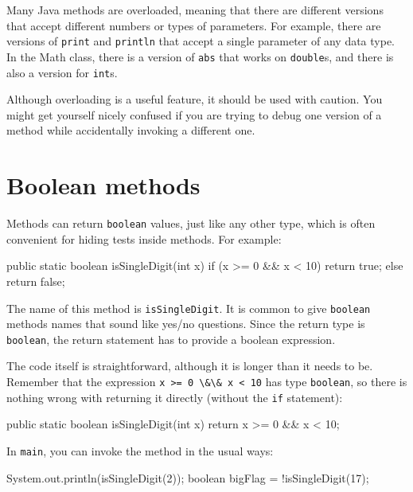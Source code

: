 \documentclass[12pt]{book}
\theoremstyle{exercise}
\newcommand{\java}[1]{\verb"#1"}
\begin{document}
Many Java methods are overloaded, meaning that there are different versions that accept different numbers or types of parameters.
For example, there are versions of \java{print} and \java{println} that accept a single parameter of any data type.
In the Math class, there is a version of \java{abs} that works on \java{double}s, and there is also a version for \java{int}s.

Although overloading is a useful feature, it should be used with caution.
You might get yourself nicely confused if you are trying to debug one version of a method while accidentally invoking a different one.


\section{Boolean methods}
\label{boolean}


Methods can return \java{boolean} values, just like any other type, which is often convenient for hiding tests inside methods.
For example:

\begin{code}
    public static boolean isSingleDigit(int x) {
        if (x >= 0 && x < 10) {
            return true;
        } else {
            return false;
        }
    }
\end{code}

The name of this method is \java{isSingleDigit}.
It is common to give \java{boolean} methods names that sound like yes/no questions.
Since the return type is \java{boolean}, the return statement has to provide a boolean expression.

The code itself is straightforward, although it is longer than it needs to be.
Remember that the expression \java{x >= 0 \&\& x < 10} has type \java{boolean}, so there is nothing wrong with returning it directly (without the \java{if} statement):

\begin{code}
    public static boolean isSingleDigit(int x) {
        return x >= 0 && x < 10;
    }
\end{code}

In \java{main}, you can invoke the method in the usual ways:

\begin{code}
    System.out.println(isSingleDigit(2));
    boolean bigFlag = !isSingleDigit(17);
\end{code}
\end{document}
